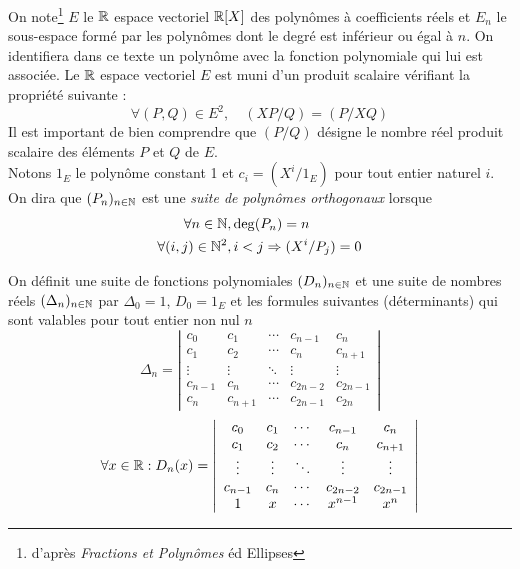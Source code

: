 On note\footnote{d'après \textit{Fractions et Polynômes} éd Ellipses} $E$ le $\mathbb{R}$ espace vectoriel $\mathbb{R}[X]$ des polynômes à coefficients réels et $E_n$ le sous-espace formé par les polynômes dont le degré est inférieur ou égal à $n$. On identifiera dans ce texte un polynôme avec la fonction polynomiale qui lui est associée. Le $\mathbb{R}$ espace vectoriel $E$ est muni d'un produit scalaire vérifiant la propriété suivante :
\begin{displaymath}
 \forall (P,Q)\in E^2,\quad (XP/Q)=(P/XQ)
\end{displaymath}
Il est important de bien comprendre que $(P/Q)$ désigne le nombre réel produit scalaire des éléments $P$ et $Q$ de $E$.\\
Notons $1_E$ le polynôme constant 1 et $c_i=(X^i/1_E)$ pour tout entier naturel $i$.\\
On dira que $(P_n)_{n\in \mathbb{N}}$ est une \emph{suite de polynômes orthogonaux} lorsque
\begin{displaymath}
  \begin{aligned}
    \forall n\in \mathbb{N} &, \deg (P_n)=n \\
    \forall (i,j)\in \mathbb{N}^2 &, i<j \Rightarrow (X^i / P_j)=0
  \end{aligned}
\end{displaymath}

On définit une suite de fonctions polynomiales $(D_n)_{n\in \mathbb{N}}$ et une suite de nombres réels $(\Delta_n)_{n\in \mathbb{N}}$ par $\Delta_0=1$, $D_0=1_E$ et les formules suivantes (déterminants) qui sont valables pour tout entier non nul $n$ 
\begin{displaymath}
 \Delta_n = \left \vert
\begin{array}{ccccc}
 c_0 & c_1 & \cdots & c_{n-1} & c_n \\
 c_1 & c_2 & \cdots & c_{n} & c_{n+1} \\
 \vdots & \vdots & \ddots & \vdots & \vdots \\
 c_{n-1} & c_n & \cdots & c_{2n-2} & c_{2n-1} \\
c_n & c_{n+1} & \cdots & c_{2n-1} & c_{2n}
\end{array}
\right \vert
\end{displaymath}
\begin{displaymath}
\forall x\in \mathbb{R}:  D_n(x) = \left \vert
\begin{array}{ccccc}
 c_0 & c_1 & \cdots & c_{n-1} & c_n \\
 c_1 & c_2 & \cdots & c_{n} & c_{n+1} \\
 \vdots & \vdots & \ddots & \vdots & \vdots \\
 c_{n-1} & c_n & \cdots & c_{2n-2} & c_{2n-1} \\
1 & x & \cdots & x^{n-1} & x^n
\end{array}
\right \vert
\end{displaymath}

